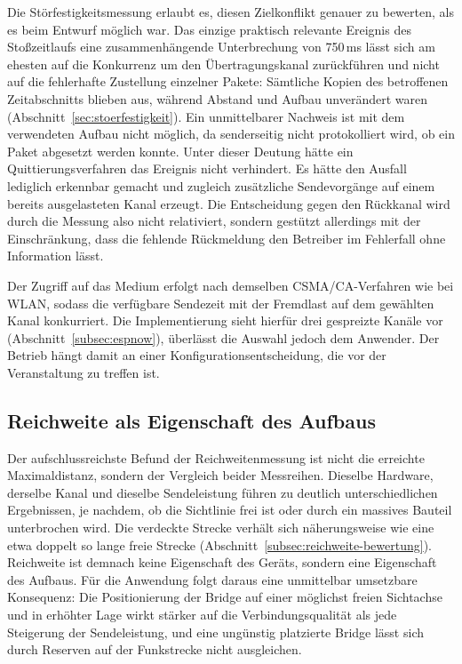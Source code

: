 Die Störfestigkeitsmessung erlaubt es, diesen Zielkonflikt genauer zu bewerten,
als es beim Entwurf möglich war. Das einzige praktisch relevante Ereignis des
Stoßzeitlaufs eine zusammenhängende Unterbrechung von 750\,ms lässt sich am
ehesten auf die Konkurrenz um den Übertragungskanal zurückführen und nicht auf
die fehlerhafte Zustellung einzelner Pakete: Sämtliche Kopien des betroffenen
Zeitabschnitts blieben aus, während Abstand und Aufbau unverändert waren
(Abschnitt~\ref{sec:stoerfestigkeit}). Ein unmittelbarer Nachweis ist mit dem
verwendeten Aufbau nicht möglich, da senderseitig nicht protokolliert wird, ob
ein Paket abgesetzt werden konnte. Unter dieser Deutung hätte ein
Quittierungsverfahren das Ereignis nicht verhindert. Es hätte den Ausfall
lediglich erkennbar gemacht und zugleich zusätzliche Sendevorgänge auf einem
bereits ausgelasteten Kanal erzeugt.
Die Entscheidung gegen den Rückkanal wird durch die Messung also nicht relativiert,
sondern gestützt allerdings mit der Einschränkung, dass die fehlende
Rückmeldung den Betreiber im Fehlerfall ohne Information lässt.

Der Zugriff auf das Medium erfolgt nach demselben CSMA/CA-Verfahren wie
bei WLAN, sodass die verfügbare Sendezeit mit der Fremdlast auf dem gewählten
Kanal konkurriert. Die Implementierung sieht hierfür drei gespreizte Kanäle vor
(Abschnitt~\ref{subsec:espnow}), überlässt die Auswahl jedoch dem Anwender. Der
Betrieb hängt damit an einer Konfigurationsentscheidung, die vor der Veranstaltung
zu treffen ist.

\subsection{Reichweite als Eigenschaft des Aufbaus}
\label{subsec:diskussion-abschattung}

Der aufschlussreichste Befund der Reichweitenmessung ist nicht die erreichte
Maximaldistanz, sondern der Vergleich beider Messreihen. Dieselbe Hardware, derselbe
Kanal und dieselbe Sendeleistung führen zu deutlich unterschiedlichen Ergebnissen,
je nachdem, ob die Sichtlinie frei ist oder durch ein massives Bauteil unterbrochen
wird. Die verdeckte Strecke verhält sich näherungsweise wie eine etwa doppelt so
lange freie Strecke (Abschnitt~\ref{subsec:reichweite-bewertung}). Reichweite ist
demnach keine Eigenschaft des Geräts, sondern eine Eigenschaft des Aufbaus. Für die
Anwendung folgt daraus eine unmittelbar umsetzbare Konsequenz: Die Positionierung
der Bridge auf einer möglichst freien Sichtachse und in erhöhter Lage wirkt
stärker auf die Verbindungsqualität als jede Steigerung der Sendeleistung, und eine
ungünstig platzierte Bridge lässt sich durch Reserven auf der Funkstrecke nicht
ausgleichen.

